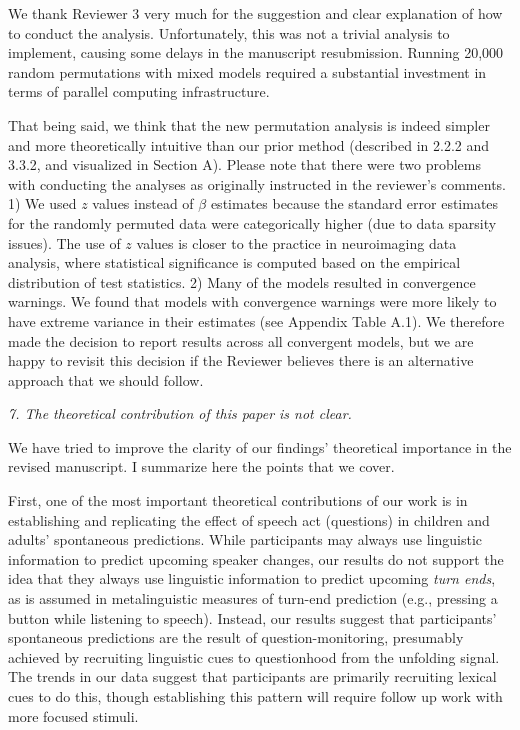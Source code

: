 \documentclass[11pt,a4paper]{letter} %
\begin{document}
\begin{letter}{}
\noindent We thank Reviewer 3 very much for the suggestion and clear explanation of how to conduct the analysis. Unfortunately, this was not a trivial analysis to implement, causing some delays in the manuscript resubmission. Running 20,000 random permutations with mixed models required a substantial investment in terms of parallel computing infrastructure. 

That being said, we think that the new permutation analysis is indeed simpler and more theoretically intuitive than our prior method (described in 2.2.2 and 3.3.2, and visualized in Section A). Please note that there were two problems with conducting the analyses as originally instructed in the reviewer's comments. 1) We used $z$ values instead of $\beta$ estimates because the standard error estimates for the randomly permuted data were categorically higher (due to data sparsity issues). The use of $z$ values is closer to the practice in neuroimaging data analysis, where statistical significance is computed based on the empirical distribution of test statistics. 2) Many of the models resulted in convergence warnings. We found that models with convergence warnings were more likely to have extreme variance in their estimates (see Appendix Table A.1). We therefore made the decision to report results across all convergent models, but we are happy to revisit this decision if the Reviewer believes there is an alternative approach that we should follow. 

\smallskip

\noindent \textit{7. The theoretical contribution of this paper is not clear.}

\noindent We have tried to improve the clarity of our findings' theoretical importance in the revised manuscript. I summarize here the points that we cover. 

First, one of the most important theoretical contributions of our work is in establishing and replicating the effect of speech act (questions) in children and adults' spontaneous predictions. While participants may always use linguistic information to predict upcoming speaker changes, our results do not support the idea that they always use linguistic information to predict upcoming \emph{turn ends}, as is assumed in metalinguistic measures of turn-end prediction (e.g., pressing a button while listening to speech). Instead, our results suggest that participants' spontaneous predictions are the result of question-monitoring, presumably achieved by recruiting linguistic cues to questionhood from the unfolding signal. The trends in our data suggest that participants are primarily recruiting lexical cues to do this, though establishing this pattern will require follow up work with more focused stimuli.


\end{letter}
\end{document}
